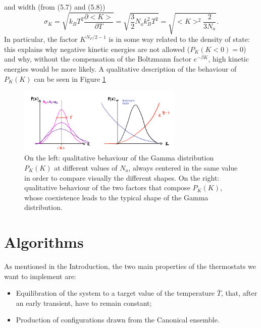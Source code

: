 and width (from (5.7) and (5.8))
\begin{equation}
    \sigma_K=\sqrt{k_B T^2 \frac{\partial <K>}{\partial T}}=\sqrt{\frac{3}{2} N_a k_B^2 T^2}= \sqrt{<K>^2 \frac{2}{3 N_a}}.
\end{equation}
In particular, the factor $K^{N_F/2 -1}$ is in some way related to the density of state: this explains why negative kinetic energies are not allowed ($P_K(K<0)=0$) and why, without the compensation of the Boltzmann factor \begin{math} e^{-\beta K} \end{math}, high kinetic energies would be more likely.
A qualitative description of the behaviour of $P_K(K)$ can be seen in Figure \ref{fig:kinetic distribution}

\begin{figure}
    \centering
    \includegraphics[width=0.7\textwidth]{Thermostats/images/kinetic distribution.PNG}
    \caption{On the left: qualitative behaviour of the Gamma distribution $P_K(K)$ at different values of $N_a$, always centered in the same value in order to compare visually the different shapes. On the right: qualitative behaviour of the two factors that compose $P_K(K)$, whose coexistence leads to the typical shape of the Gamma distribution.}
    \label{fig:kinetic distribution}
\end{figure}

\section{Algorithms}

As mentioned in the Introduction, the two main properties of the thermostats we want to implement are:
\begin{itemize}
    \item Equilibration of the system to a target value of the temperature $\bar T$, that, after an early transient, have to remain constant;
    \item Production of configurations drawn from the Canonical ensemble.
\end{itemize}

